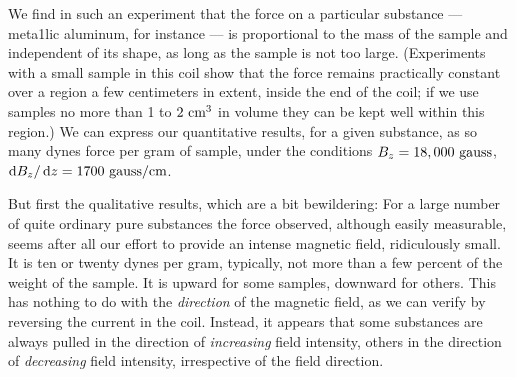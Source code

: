 We find in such an experiment that the force on a particular
substance --- meta1lic aluminum, for instance --- is proportional to the
mass of the sample and independent of its shape, as long as the
sample is not too large. (Experiments with a small sample in this
coil show that the force remains practically constant over a region a
few centimeters in extent, inside the end of the coil; if we use samples
no more than 1 to $2\ \textup{cm}^3$ in volume they can be kept well within this
region.) We can express our quantitative results, for a given 
substance, as so many dynes force per gram of sample, under the conditions
$B_z = 18,000\ \textup{gauss}$, $\operatorname{d\!} B_z/\operatorname{d\!} z = 1700\ \textup{gauss}/\textup{cm}$.

But first the qualitative results, which are a bit bewildering: For
a large number of quite ordinary pure substances the force observed,
although easily measurable, seems after all our effort to provide an
intense magnetic field, ridiculously small. It is ten or twenty dynes
per gram, typically, not more than a few percent of the weight of the
sample. It is upward for some samples, downward for others. This
has nothing to do with the \emph{direction} of the magnetic field, as we can
verify by reversing the current in the coil. Instead, it appears that
some substances are always pulled in the direction of \emph{increasing} field
intensity, others in the direction of \emph{decreasing} field intensity, irrespective
of the field direction.

